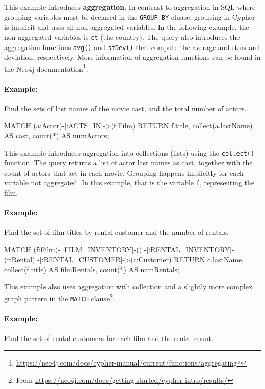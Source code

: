 This example introduces \textbf{aggregation}. In contrast to aggregation in SQL where grouping variables must be declared in the \texttt{GROUP BY} cluase, grouping in Cypher is implicit and uses all non-aggregated variables. In the following example, the non-aggregated variables is \texttt{ct} (the country). The query also introduces the aggregation functions \texttt{avg()} and \texttt{stDev()} that compute the average and standard deviation, respectively. More information of aggregation functions can be found in the Neo4j documentation\footnote{\url{https://neo4j.com/docs/cypher-manual/current/functions/aggregating/}}.

\paragraph*{Example:} Find the sets of last names of the movie cast, and the total number of actors.

\begin{cyphercode}
MATCH (a:Actor)-[:ACTS_IN]->(f:Film) 
RETURN f.title, 
       collect(a.lastName) AS cast, 
       count(*) AS numActors;
\end{cyphercode}

This example introduces aggregation into collections (lists) using the \texttt{collect()} function. The query returns a list of actor last names as cast, together with the count of actors that act in each movie. Grouping happens implicitly for each variable not aggregated. In this example, that is the variable \texttt{f}, representing the film.

\paragraph*{Example:} Find the set of film titles by rental customer and the number of rentals.

\begin{cyphercode}
MATCH (f:Film)-[:FILM_INVENTORY]-()
      -[:RENTAL_INVENTORY]-(r:Rental)
      -[:RENTAL_CUSTOMER]->(c:Customer)
RETURN c.lastName, 
       collect(f.title) AS filmRentals, 
       count(*) AS numRentals;
\end{cyphercode}

This example also uses aggregation with collection and a slightly more complex graph pattern in the \texttt{MATCH} clause\footnote{From \url{https://neo4j.com/docs/getting-started/cypher-intro/results/}}.

\paragraph*{Example:} Find the set of rental customers for each film and the rental count.

